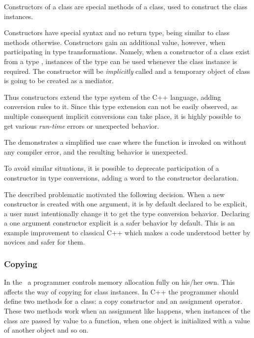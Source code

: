 \cppproblem

Constructors of a class are special methods of a class, used to construct the class instances. 

Constructors have special syntax and no return type, being similar to class methods otherwise. Constructors gain an additional 
value, however, when participating in type transformations. Namely, when
a constructor of a class  exist from a type , instances of the type  can be used whenever
the  class instance is required. The constructor will be \emph{implicitly} called and a temporary object
of class  is going to be created as a mediator. 

Thus constructors extend the type system of the C++ language, adding conversion rules to it. 
Since this type extension can not be easily observed, as multiple consequent implicit conversions can take place, 
it is highly possible to get various \emph{run-time} errors or unexpected behavior. 


The  demonstrates a simplified use case where the  function is invoked on  without 
any compiler error, and the resulting behavior is unexpected.

To avoid similar situations, it is possible to deprecate participation 
of a constructor in type conversions, adding a word  to the constructor
declaration.

\pcppsolution

The described problematic motivated the following decision. When a new constructor is created with one argument, 
it is by default declared to be explicit, a user must intentionally change it to get the type conversion 
behavior. Declaring a one argument constructor explicit is  a safer  behavior by default. 
This is an example improvement to classical C++ which makes
a code understood better by novices and safer for them.

\subsubsection{Copying}
\label{classcopying}

\cppproblem

In the \cpppl\ a programmer controls memory allocation fully on his/her own. This affects the way of copying for  class
instances.
In C++ the programmer should define two methods for a class: a copy constructor and an assignment operator.
These two methods work when an assignment like  happens, when instances of the class are passed by value to a function, 
when one object is initialized with a value of another object and so on.

